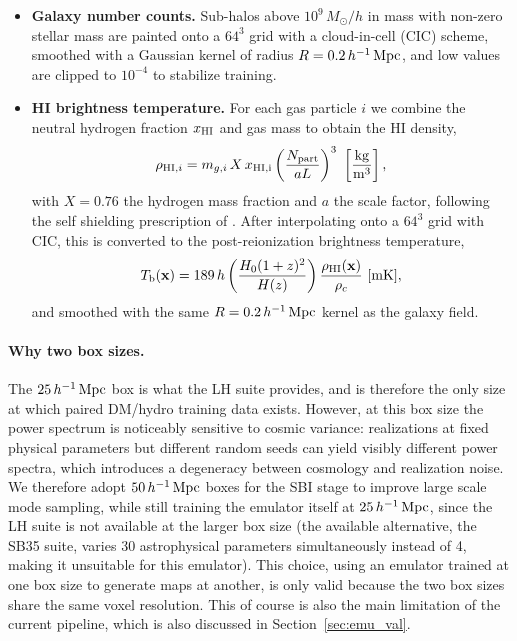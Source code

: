 \begin{itemize}
    \item \textbf{Galaxy number counts.} Sub-halos above $10^9\,M_\odot/h$
    in mass with non-zero stellar mass are painted onto a $64^3$ grid with
    a cloud-in-cell (CIC) scheme, smoothed with a Gaussian kernel of radius
    $R=0.2\,h^{-1}\,\mathrm{Mpc}$, and low values are clipped to $10^{-4}$ to stabilize
    training.
    \item \textbf{HI brightness temperature.} For each gas particle $i$ we
    combine the neutral hydrogen fraction $x_\mathrm{HI}$ and gas mass to obtain the
    HI density,
    \begin{equation}
        \rho_{\mathrm{HI},i} = m_{g,i}\, X\, x_\mathrm{HI,i}
        \left(\frac{N_{\rm part}}{a L}\right)^{3}\ \left[\frac{\rm kg}{\rm m^3}\right],
    \end{equation}
    with $X=0.76$ the hydrogen mass fraction and $a$ the scale factor,
    following the self shielding prescription of
    \citet{villaescusa-navarro_ingredients_2018}. After interpolating onto a
    $64^3$ grid with CIC, this is converted to the post-reionization
    brightness temperature,
    \begin{equation}
        \Tb(\mathbf{x}) = 189\, h \left(\frac{H_0 (1+z)^2}{H(z)}\right)
        \frac{\rho_{\mathrm{HI}}(\mathbf{x})}{\rho_c}\ [\mathrm{mK}],
    \end{equation}
    and smoothed with the same $R=0.2\,h^{-1}\,\mathrm{Mpc}$ kernel as the galaxy field.
\end{itemize}

\paragraph{Why two box sizes.}
The $25\,h^{-1}\,\mathrm{Mpc}$ box is what the \CAMELS LH suite provides, and is therefore
the only size at which paired DM/hydro training data exists. However, at
this box size the power spectrum is noticeably sensitive to cosmic variance:
realizations at fixed physical parameters but different random seeds can
yield visibly different power spectra, which introduces a degeneracy
between cosmology and realization noise. We therefore adopt $50\,h^{-1}\,\mathrm{Mpc}$ boxes
for the SBI stage to improve large scale mode sampling, while still training
the emulator itself at $25\,h^{-1}\,\mathrm{Mpc}$, since the LH suite is not available at the
larger box size (the available alternative, the SB35 suite, varies 30
astrophysical parameters simultaneously instead of 4, making it unsuitable
for this emulator). This choice, using an emulator trained at one box size
to generate maps at another, is only valid because the two box sizes share
the same voxel resolution. This of course is also the main limitation of the current pipeline, which is also discussed in Section~\ref{sec:emu_val}.

